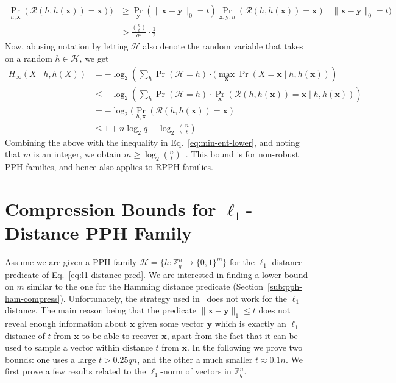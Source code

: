 \documentclass[pdflatex,sn-mathphys-num]{sn-jnl}
\theoremstyle{definition}
\newcommand{\vtr}[1]{\mathbf{#1}}
\newcommand{\norm}[1]{\lVert{#1}\rVert}
\begin{document}
\begin{align*}
    \Pr_{h, \mathbf{x}} ( \mathcal{R}(h, h(\vtr{x})) = \vtr{x}) ) &\geq \Pr_{\vtr{y}} (\norm{\vtr{x} - \vtr{y}}_0 = t)  \Pr_{\vtr{x}, \vtr{y}, h} (\mathcal{R}(h, h(\vtr{x})) = \vtr{x}) \mid \norm{\vtr{x} - \vtr{y}}_0 = t) \\
    &> \frac{\binom{n}{t}}{q^n} \cdot \frac{1}{2}
\end{align*}
Now, abusing notation by letting $\mathcal{H}$ also denote the random variable that takes on a random $h \in \mathcal{H}$, we get
\begin{align}
H_\infty(X \mid h, h(X)) 
&= -\log_2 \left(\sum_h \Pr(\mathcal{H} = h) \cdot (\max_{\vtr{x}} \Pr(X = \vtr{x} \mid h, h(\vtr{x}))\right) \nonumber\\
& \leq -\log_2 \left( \sum_h \Pr(\mathcal{H} = h) \cdot \Pr_\vtr{x} ( \mathcal{R}(h, h(\vtr{x})) = \vtr{x} \mid h, h(\vtr{x})) \right) \nonumber\\
&= -\log_2 (\Pr_{h, \vtr{x}} ( \mathcal{R}(h, h(\vtr{x})) = \vtr{x}) \label{eq:ent-upper-bound}\\
&\leq 1 + n \log_2 q - \log_2 \binom{n}{t} \nonumber
\end{align}
Combining the above with the inequality in Eq.~\eqref{eq:min-ent-lower}, and noting that $m$ is an integer, we obtain $m \geq \log_2 \binom{n}{t}$~\cite{holmgren2022nearly}. This bound is for non-robust PPH families, and hence also applies to RPPH families.




\section{\texorpdfstring{Compression Bounds for $\ell_1$-Distance PPH Family}{Compression Bounds for l1-Distance PPH Family}
}
\label{sub:l1-bound}
Assume we are given a PPH family $\mathcal{H} = \{h: \mathbb{Z}_q^n \rightarrow \{0, 1\}^m\}$ for the $\ell_1$-distance predicate of Eq.~\eqref{eq:l1-distance-pred}.
We are interested in finding a lower bound on $m$ similar to the one for the Hamming distance predicate (Section~\ref{sub:pph-ham-compress}). Unfortunately, the strategy used in~\cite{holmgren2022nearly} does not work for the $\ell_1$ distance. The main reason being that the predicate $\norm{\vtr{x} - \vtr{y}}_1 \leq t$ does not reveal enough information about $\vtr{x}$ given some vector $\vtr{y}$ which is exactly an $\ell_1$ distance of $t$ from $\vtr{x}$ to be able to recover $\vtr{x}$, apart from the fact that it can be used to sample a vector within distance $t$ from $\vtr{x}$. In the following we prove two bounds: one uses a large $t > 0.25qn$, and the other a much smaller $t \approx 0.1n$. We first prove a few results related to the $\ell_1$-norm of vectors in $\mathbb{Z}_q^n$. 
\end{document}
